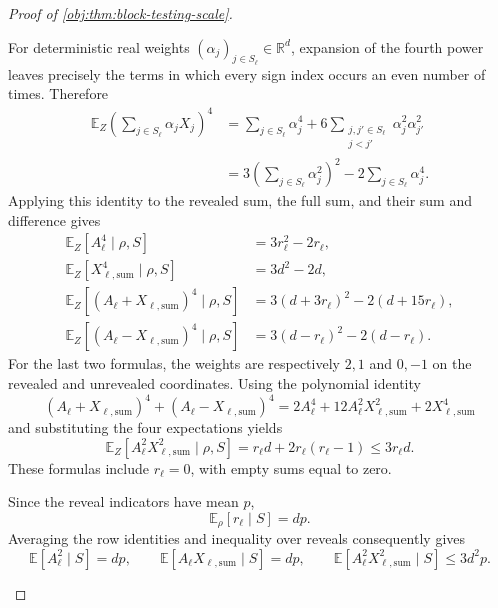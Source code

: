 \documentclass[11pt]{article}
\begin{document}
\begin{proof}[Proof of \cref{obj:thm:block-testing-scale}]
\begin{enumerate}
For deterministic real weights \((\alpha_j)_{j\in S_\ell}\in\mathbb R^d\), expansion of the fourth power leaves precisely the terms in which every sign index occurs an even number of times. Therefore
\[
\begin{aligned}
\mathbb E_Z\left(\sum_{j\in S_\ell}\alpha_jX_j\right)^4
&=
\sum_{j\in S_\ell}\alpha_j^4
+
6\sum_{\substack{j,j'\in S_\ell\\j<j'}}
\alpha_j^2\alpha_{j'}^2\\
&=
3\left(\sum_{j\in S_\ell}\alpha_j^2\right)^2
-2\sum_{j\in S_\ell}\alpha_j^4.
\end{aligned}
\]
Applying this identity to the revealed sum, the full sum, and their sum and difference gives
\[
\begin{aligned}
\mathbb E_Z[A_\ell^4\mid\rho,S]
&=3r_\ell^2-2r_\ell,\\
\mathbb E_Z[X_{\ell,\mathrm{sum}}^4\mid\rho,S]
&=3d^2-2d,\\
\mathbb E_Z[(A_\ell+X_{\ell,\mathrm{sum}})^4\mid\rho,S]
&=3(d+3r_\ell)^2-2(d+15r_\ell),\\
\mathbb E_Z[(A_\ell-X_{\ell,\mathrm{sum}})^4\mid\rho,S]
&=3(d-r_\ell)^2-2(d-r_\ell).
\end{aligned}
\]
For the last two formulas, the weights are respectively \(2,1\) and \(0,-1\) on the revealed and unrevealed coordinates. Using the polynomial identity
\[
(A_\ell+X_{\ell,\mathrm{sum}})^4
+(A_\ell-X_{\ell,\mathrm{sum}})^4
=
2A_\ell^4+12A_\ell^2X_{\ell,\mathrm{sum}}^2
+2X_{\ell,\mathrm{sum}}^4
\]
and substituting the four expectations yields
\[
\mathbb E_Z[
A_\ell^2X_{\ell,\mathrm{sum}}^2\mid\rho,S]
=
r_\ell d+2r_\ell(r_\ell-1)
\le3r_\ell d.
\]
These formulas include \(r_\ell=0\), with empty sums equal to zero.

Since the reveal indicators have mean \(p\),
\[
\mathbb E_\rho[r_\ell\mid S]=dp.
\]
Averaging the row identities and inequality over reveals consequently gives
\[
\mathbb E[A_\ell^2\mid S]=dp,
\qquad
\mathbb E[A_\ell X_{\ell,\mathrm{sum}}\mid S]=dp,
\qquad
\mathbb E[A_\ell^2X_{\ell,\mathrm{sum}}^2\mid S]
\le3d^2p.
\]


\end{enumerate}
\end{proof}
\end{document}
